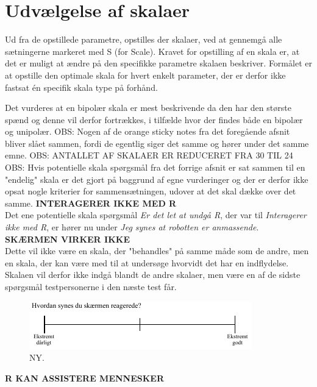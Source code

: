 \section{Udvælgelse af skalaer}
\label{ParametreDatabehandlingSkalaer}
%
Ud fra de opstillede parametre, opstilles der skalaer, ved at gennemgå alle sætningerne markeret med S (for Scale). Kravet for opstilling af en skala er, at det er muligt at ændre på den specifikke parametre skalaen beskriver. Formålet er at opstille den optimale skala for hvert enkelt parameter, der er derfor ikke fastsat én specifik skala type på forhånd. 

Det vurderes at en bipolær skala er mest beskrivende da den har den største spænd og denne vil derfor fortrækkes, i tilfælde hvor der findes både en bipolær og unipolær. \blankline
%
OBS: Nogen af de orange sticky notes fra det foregående afsnit bliver slået sammen, fordi de egentlig siger det samme og hører under det samme emne. \blankline
%
OBS: ANTALLET AF SKALAER ER REDUCERET FRA 30 TIL 24
%
OBS: Hvis potentielle skala spørgsmål fra det forrige afsnit er sat sammen til en "endelig" skala er det gjort på baggrund af egne vurderinger og der er derfor ikke opsat nogle kriterier for sammensætningen, udover at det skal dække over det samme.\blankline
%
\textbf{INTERAGERER IKKE MED R}\\
Det ene potentielle skala spørgsmål \textit{Er det let at undgå R}, der var til \textit{Interagerer ikke med R}, er hører nu under \textit{Jeg synes at robotten er anmassende}.\blankline
%
\textbf{SKÆRMEN VIRKER IKKE}\\
Dette vil ikke være en skala, der "behandles" på samme måde som de andre, men en skala, der kan være med til at undersøge hvorvidt det har en indflydelse. Skalaen vil derfor ikke indgå blandt de andre skalaer, men være en af de sidste spørgsmål testpersonerne i den næste test får. 
%
\begin{figure}[H]
\centering
\includegraphics[width =\textwidth]{Figure/UdvalgteSkalaer/SkaermensReaktion} 
\caption{NY.}
\label{fig:SkalaSkaermensReaktion}
\end{figure}
\noindent
%
\textbf{R KAN ASSISTERE MENNESKER}\\
